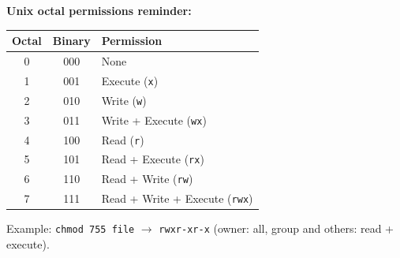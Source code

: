 \documentclass[a4paper,11pt]{article}
\theoremstyle{plain}
\theoremstyle{definition}
\begin{document}
\begin{rappel}
\medskip
\textbf{Unix octal permissions reminder:}
\begin{center}
\begin{tabular}{ccl}
\toprule
\textbf{Octal} & \textbf{Binary} & \textbf{Permission} \\
\midrule
0 & 000 & None \\
1 & 001 & Execute (\texttt{x}) \\
2 & 010 & Write (\texttt{w}) \\
3 & 011 & Write + Execute (\texttt{wx}) \\
4 & 100 & Read (\texttt{r}) \\
5 & 101 & Read + Execute (\texttt{rx}) \\
6 & 110 & Read + Write (\texttt{rw}) \\
7 & 111 & Read + Write + Execute (\texttt{rwx}) \\
\bottomrule
\end{tabular}
\end{center}

Example: \texttt{chmod 755 file} $\rightarrow$ \texttt{rwxr-xr-x} (owner: all, group and others: read + execute).
\end{rappel}
\end{document}
